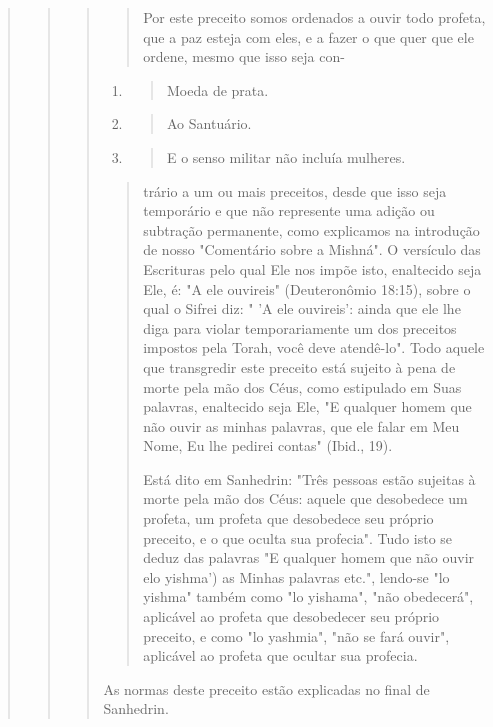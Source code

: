 \begin{quote}
\begin{quote}
\begin{quote}
\begin{quote}
Por este preceito somos ordenados a ouvir todo profeta, que a paz esteja
com eles, e a fazer o que quer que ele ordene, mesmo que isso seja con-
\end{quote}

\begin{enumerate}
\def\labelenumi{\arabic{enumi}.}
\setcounter{enumi}{185}
\item
 \begin{quote}
 Moeda de prata.
 \end{quote}
\item
 \begin{quote}
 Ao Santuário.
 \end{quote}
\item
 \begin{quote}
 E o senso militar não incluía mulheres.
 \end{quote}
\end{enumerate}

\begin{quote}trário a um ou mais preceitos, desde que isso seja temporário e que não
repre­sente uma adição ou subtração permanente, como explicamos na
introdução de nosso "Comentário sobre a Mishná". O versículo das
Escrituras pelo qual Ele nos impõe isto, enaltecido seja Ele, é: "A ele
ouvireis" (Deuteronômio 18:15), sobre o qual o Sifrei diz: " 'A ele
ouvireis': ainda que ele lhe diga para violar temporariamente um dos
preceitos impostos pela Torah, você deve atendê-lo". Todo aquele que
transgredir este preceito está sujeito à pena de morte pela mão dos
Céus, como estipulado em Suas palavras, enaltecido seja Ele, "E qualquer
homem que não ouvir as minhas palavras, que ele falar em Meu Nome, Eu
lhe pedirei contas" (Ibid., 19).

Está dito em Sanhedrin: "Três pessoas estão sujeitas à morte pela mão
dos Céus: aquele que desobedece um profeta, um profeta que desobedece
seu próprio preceito, e o que oculta sua profecia". Tudo isto se deduz
das palavras "E qualquer homem que não ouvir elo yishma') as Minhas
palavras etc.", lendo-se "lo yishma" também como "lo yishama", "não
obedecerá", aplicável ao pro­feta que desobedecer seu próprio preceito,
e como "lo yashmia", "não se fará ouvir", aplicável ao profeta que
ocultar sua profecia.
\end{quote}

As normas deste preceito estão explicadas no final de Sanhedrin.

\begin{quote}


\end{quote}
\end{quote}
\end{quote}
\end{quote}
